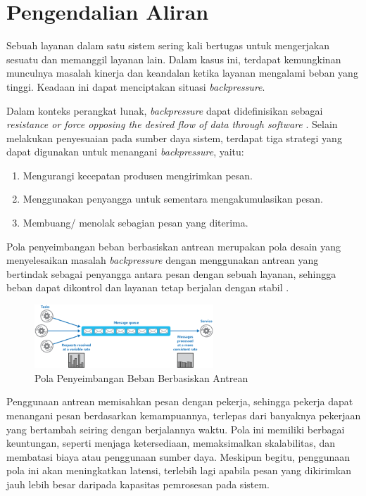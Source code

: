 \section{Pengendalian Aliran}

Sebuah layanan dalam satu sistem sering kali bertugas untuk mengerjakan sesuatu dan memanggil layanan lain. Dalam kasus ini, terdapat kemungkinan munculnya masalah kinerja dan keandalan ketika layanan mengalami beban yang tinggi. Keadaan ini dapat menciptakan situasi \textit{backpressure}.

Dalam konteks perangkat lunak, \textit{backpressure} dapat didefinisikan sebagai \textit{resistance or force opposing the desired flow of data through software} \parencite{backpressureExplained}. Selain melakukan penyesuaian pada sumber daya sistem, terdapat tiga strategi yang dapat digunakan untuk menangani \textit{backpressure}, yaitu:

\begin{enumerate}
    \item Mengurangi kecepatan produsen mengirimkan pesan.
    \item Menggunakan penyangga untuk sementara mengakumulasikan pesan.
    \item Membuang/ menolak sebagian pesan yang diterima.
\end{enumerate}

Pola penyeimbangan beban berbasiskan antrean merupakan pola desain yang menyelesaikan masalah \textit{backpressure} dengan menggunakan antrean yang bertindak sebagai penyangga antara pesan dengan sebuah layanan, sehingga beban dapat dikontrol dan layanan tetap berjalan dengan stabil \parencite{queueLoadLeveling}.

\begin{figure}[htbp]
    \centering
    \includegraphics[width=0.6\textwidth]{resources/chapter-2/queue-based-load-leveling-pattern.png}
    \caption{Pola Penyeimbangan Beban Berbasiskan Antrean \parencite{queueLoadLeveling}}
    \label{fig:queue-based-load-leveling-pattern}
\end{figure}

Penggunaan antrean memisahkan pesan dengan pekerja, sehingga pekerja dapat menangani pesan berdasarkan kemampuannya, terlepas dari banyaknya pekerjaan yang bertambah seiring dengan berjalannya waktu. Pola ini memiliki berbagai keuntungan, seperti menjaga ketersediaan, memaksimalkan skalabilitas, dan membatasi biaya atau penggunaan sumber daya. Meskipun begitu, penggunaan pola ini akan meningkatkan latensi, terlebih lagi apabila pesan yang dikirimkan jauh lebih besar daripada kapasitas pemrosesan pada sistem.